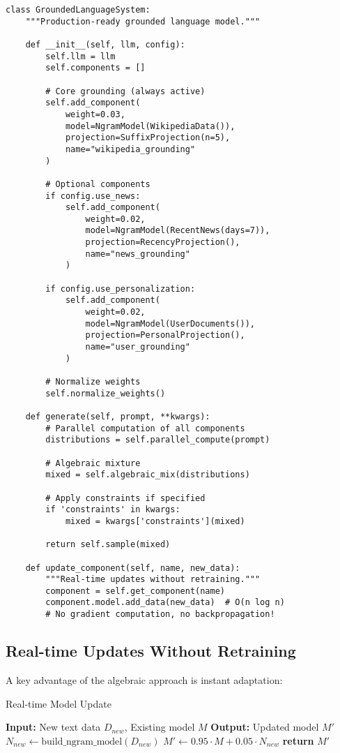 \documentclass{article}
\theoremstyle{definition}
\begin{document}
\begin{lstlisting}
class GroundedLanguageSystem:
    """Production-ready grounded language model."""

    def __init__(self, llm, config):
        self.llm = llm
        self.components = []

        # Core grounding (always active)
        self.add_component(
            weight=0.03,
            model=NgramModel(WikipediaData()),
            projection=SuffixProjection(n=5),
            name="wikipedia_grounding"
        )

        # Optional components
        if config.use_news:
            self.add_component(
                weight=0.02,
                model=NgramModel(RecentNews(days=7)),
                projection=RecencyProjection(),
                name="news_grounding"
            )

        if config.use_personalization:
            self.add_component(
                weight=0.02,
                model=NgramModel(UserDocuments()),
                projection=PersonalProjection(),
                name="user_grounding"
            )

        # Normalize weights
        self.normalize_weights()

    def generate(self, prompt, **kwargs):
        # Parallel computation of all components
        distributions = self.parallel_compute(prompt)

        # Algebraic mixture
        mixed = self.algebraic_mix(distributions)

        # Apply constraints if specified
        if 'constraints' in kwargs:
            mixed = kwargs['constraints'](mixed)

        return self.sample(mixed)

    def update_component(self, name, new_data):
        """Real-time updates without retraining."""
        component = self.get_component(name)
        component.model.add_data(new_data)  # O(n log n)
        # No gradient computation, no backpropagation!
\end{lstlisting}

\subsection{Real-time Updates Without Retraining}

A key advantage of the algebraic approach is instant adaptation:

\begin{algorithm}
\caption{Real-time Model Update}
\begin{algorithmic}[1]
\STATE \textbf{Input:} New text data $D_{new}$, Existing model $M$
\STATE \textbf{Output:} Updated model $M'$
\STATE
\STATE {}
\STATE {}
\STATE
\STATE $N_{new} \leftarrow \text{build\_ngram\_model}(D_{new})$ 
\STATE $M' \leftarrow 0.95 \cdot M + 0.05 \cdot N_{new}$ 
\STATE \textbf{return} $M'$
\end{algorithmic}
\end{algorithm}
\end{document}
